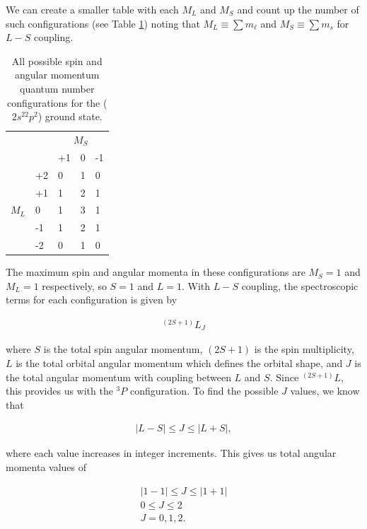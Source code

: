 \documentclass[12pt]{article}
\begin{document}
We can create a smaller table with each $M_L$ and $M_S$ and count up the number of such configurations (see Table \ref{table:config1_table2}) noting that $M_L \equiv \sum m_\ell$ and $M_S \equiv \sum m_s$ for $L-S$ coupling.

\begin{table}[ht]
\centering
\caption{All possible spin and angular momentum quantum number configurations for the ($2s^22p^2$) ground state.}
\label{table:config1_table2}
\begin{tabular}{|ll|lll|}
\hline
\multicolumn{2}{|c}{} & \multicolumn{3}{|c|}{$M_S$} \\
\multicolumn{2}{|c|}{} & +1 & 0 & -1 \\
\hline
      & +2 & 0 & 1 & 0 \\
      & +1 & 1 & 2 & 1 \\
$M_L$ &  0 & 1 & 3 & 1  \\
      & -1 & 1 & 2 & 1 \\
      & -2 & 0 & 1 & 0 \\
\hline
\end{tabular}
\end{table}

The maximum spin and angular momenta in these configurations are $M_S = 1$ and $M_L = 1$ respectively, so $S=1$ and $L=1$. With $L-S$ coupling, the spectroscopic terms for each configuration is given by

\begin{align*}
^(2S+1)L_J
\end{align*}

where $S$ is the total spin angular momentum, $(2S+1)$ is the spin multiplicity, $L$ is the total orbital angular momentum which defines the orbital shape, and $J$ is the total angular momentum with coupling between $L$ and $S$. Since $^{(2S+1)}L$, this provides us with the $^3P$ configuration. To find the possible $J$ values, we know that 

\begin{align*}
|L-S| \leq J \leq |L+S|,
\end{align*}

where each value increases in integer increments. This gives us total angular momenta values of

\begin{align*}
|1-1| \leq J \leq |1+1| \\
0 \leq J \leq 2 \\
J = 0,1,2.
\end{align*}
\end{document}
